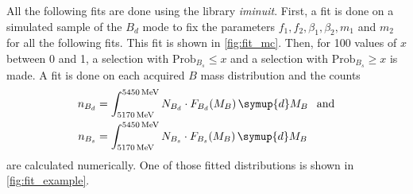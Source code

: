 All the following fits are done using the library \emph{iminuit}\cite{iminuit}.
First, a fit is done on a simulated sample of the $B_d$ mode to fix the parameters $f_1,f_2,\beta_1,\beta_2,m_1$ and $m_2$ for all the following fits. 
This fit is shown in \cref{fig:fit_mc}.
Then, for 100 values of $x$ between 0 and 1, a selection with $\text{Prob}_{B_s} \leq x$ and a selection with $\text{Prob}_{B_s} \geq x$ is made.
A fit is done on each acquired $B$ mass distribution and the counts
\begin{align}
    n_{B_d} &= \int_{\qty{5170}{\MeV}}^{\qty{5450}{\MeV}} N_{B_d} \cdot F_{B_d}(M_B) \, \symup{d}M_B \:\:\text{ and} \\
    n_{B_s} &= \int_{\qty{5170}{\MeV}}^{\qty{5450}{\MeV}} N_{B_s} \cdot F_{B_s}(M_B) \, \symup{d}M_B
\end{align}
are calculated numerically.
One of those fitted distributions is shown in \cref{fig:fit_example}.

